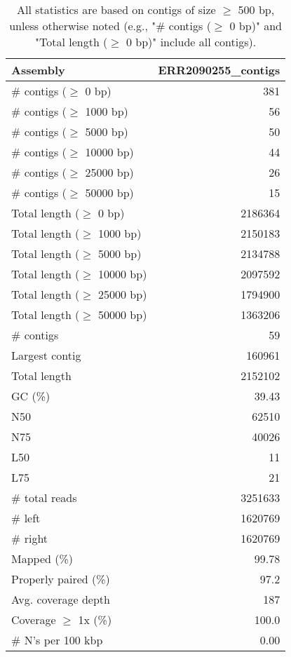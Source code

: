 \documentclass[12pt,a4paper]{article}
\begin{document}
\begin{table}[ht]
\begin{center}
\caption{All statistics are based on contigs of size $\geq$ 500 bp, unless otherwise noted (e.g., "\# contigs ($\geq$ 0 bp)" and "Total length ($\geq$ 0 bp)" include all contigs).}
\begin{tabular}{|l*{1}{|r}|}
\hline
Assembly & ERR2090255\_contigs \\ \hline
\# contigs ($\geq$ 0 bp) & 381 \\ \hline
\# contigs ($\geq$ 1000 bp) & 56 \\ \hline
\# contigs ($\geq$ 5000 bp) & 50 \\ \hline
\# contigs ($\geq$ 10000 bp) & 44 \\ \hline
\# contigs ($\geq$ 25000 bp) & 26 \\ \hline
\# contigs ($\geq$ 50000 bp) & 15 \\ \hline
Total length ($\geq$ 0 bp) & 2186364 \\ \hline
Total length ($\geq$ 1000 bp) & 2150183 \\ \hline
Total length ($\geq$ 5000 bp) & 2134788 \\ \hline
Total length ($\geq$ 10000 bp) & 2097592 \\ \hline
Total length ($\geq$ 25000 bp) & 1794900 \\ \hline
Total length ($\geq$ 50000 bp) & 1363206 \\ \hline
\# contigs & 59 \\ \hline
Largest contig & 160961 \\ \hline
Total length & 2152102 \\ \hline
GC (\%) & 39.43 \\ \hline
N50 & 62510 \\ \hline
N75 & 40026 \\ \hline
L50 & 11 \\ \hline
L75 & 21 \\ \hline
\# total reads & 3251633 \\ \hline
\# left & 1620769 \\ \hline
\# right & 1620769 \\ \hline
Mapped (\%) & 99.78 \\ \hline
Properly paired (\%) & 97.2 \\ \hline
Avg. coverage depth & 187 \\ \hline
Coverage $\geq$ 1x (\%) & 100.0 \\ \hline
\# N's per 100 kbp & 0.00 \\ \hline
\end{tabular}
\end{center}
\end{table}
\end{document}
